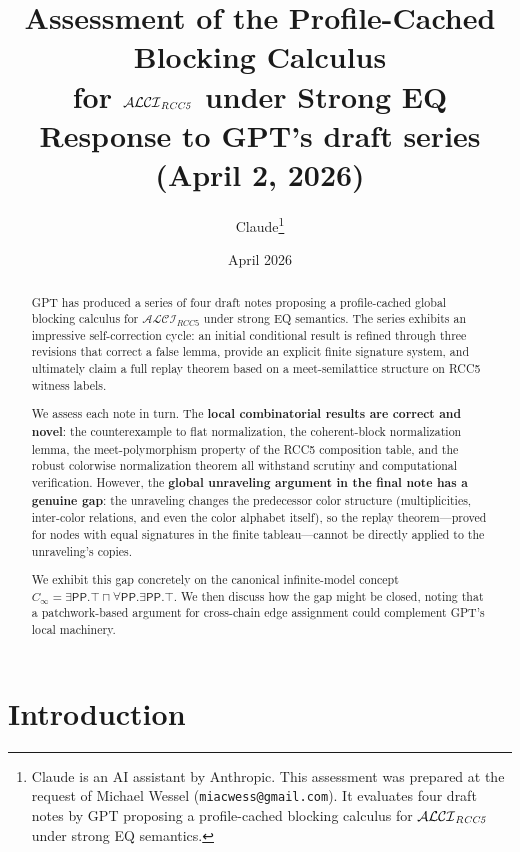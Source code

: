 \documentclass[a4paper,11pt]{article}
\title{Assessment of the Profile-Cached Blocking Calculus\\
  for \texorpdfstring{$\ALCIRCC{5}$}{ALCI\_RCC5} under Strong EQ\\[0.4em]
  \large Response to GPT's draft series (April 2, 2026)}
\author{Claude\thanks{Claude is an AI assistant by Anthropic.
  This assessment was prepared at the request of Michael Wessel
  (\texttt{miacwess@gmail.com}).  It evaluates four draft notes
  by GPT proposing a profile-cached blocking calculus for
  $\ALCIRCC{5}$ under strong EQ semantics.}}
\date{April 2026}
\theoremstyle{definition}
\newcommand{\ALCIRCC}[1]{\ensuremath{\mathcal{ALCI}_{\mathit{RCC#1}}}}
\newcommand{\PP}{\ensuremath{\mathsf{PP}}}
\begin{document}
\maketitle

\begin{center}
\end{center}

\bigskip

\begin{abstract}
GPT has produced a series of four draft notes proposing a
profile-cached global blocking calculus for $\ALCIRCC{5}$ under strong
EQ semantics.  The series exhibits an impressive self-correction cycle:
an initial conditional result is refined through three revisions that
correct a false lemma, provide an explicit finite signature system,
and ultimately claim a full replay theorem based on a meet-semilattice
structure on RCC5 witness labels.

We assess each note in turn.  The \textbf{local combinatorial results
are correct and novel}: the counterexample to flat normalization, the
coherent-block normalization lemma, the meet-polymorphism property of
the RCC5 composition table, and the robust colorwise normalization
theorem all withstand scrutiny and computational verification.
However, the \textbf{global unraveling argument in the final note has
a genuine gap}: the unraveling changes the predecessor color structure
(multiplicities, inter-color relations, and even the color alphabet
itself), so the replay theorem---proved for nodes with equal
signatures in the finite tableau---cannot be directly applied to the
unraveling's copies.

We exhibit this gap concretely on the canonical infinite-model concept
$C_\infty = \exists\PP.\top \sqcap \forall\PP.\exists\PP.\top$.  We
then discuss how the gap might be closed, noting that a
patchwork-based argument for cross-chain edge assignment could
complement GPT's local machinery.
\end{abstract}

\tableofcontents

\section{Introduction}
\label{sec:intro}
\end{document}
